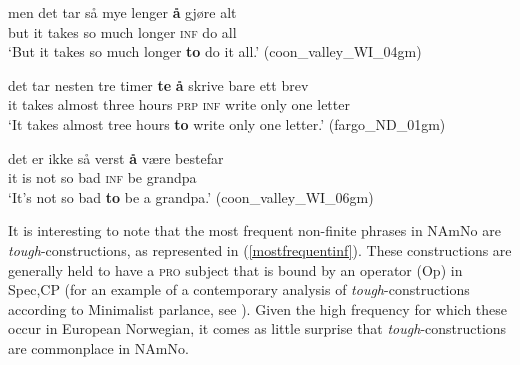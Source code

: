 \documentclass[output=paper,colorlinks,citecolor=brown]{langscibook}
\begin{document}
\begin{exe} 

\item \label{arbitrarycontrol}

\begin{xlist}

         
\item \label{arbit2} \gll men det tar så mye lenger \textbf{{\aa}} gjøre alt \\
        but it takes so much longer \textsc{inf} do all \\
         \glt `But it takes so much longer \textbf{to} do it all.' \hfill(coon\_valley\_WI\_04gm)

\item \label{arbit3} \gll det tar nesten tre timer \textbf{te} \textbf{{\aa}} skrive bare ett brev \\
        it takes almost three hours \textsc{prp} \textsc{inf} write only one letter \\
         \glt `It takes almost tree hours \textbf{to} write only one letter.' \hfill(fargo\_ND\_01gm)

\item \label{arbit4} \gll det er ikke så verst \textbf{{\aa}} være bestefar \\
        it is not so bad \textsc{inf} be grandpa \\
         \glt `It's not so bad \textbf{to} be a grandpa.' \hfill(coon\_valley\_WI\_06gm)

                  
\end{xlist}
\end{exe}



It is interesting to note that the most frequent non-finite phrases in NAmNo are \textit{tough}-constructions, as represented in (\ref{mostfrequentinf}). These constructions are generally held to have a \textsc{pro} subject that is bound by an operator (Op) in Spec,CP (for an example of a contemporary analysis of \textit{tough}-constructions according to Minimalist parlance, see \citealt{hicks09}). Given the high frequency for which these occur in European Norwegian, it comes as little surprise that \textit{tough}-constructions are commonplace in NAmNo. 
\end{document}

